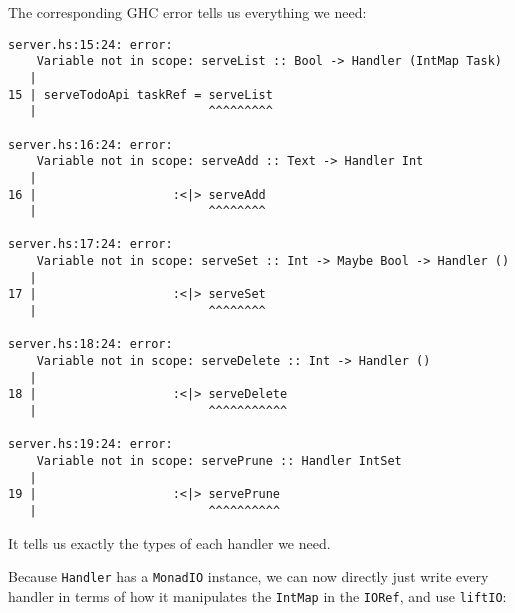 \documentclass[]{article}
\begin{document}
The corresponding GHC error tells us everything we need:

\begin{verbatim}
server.hs:15:24: error:
    Variable not in scope: serveList :: Bool -> Handler (IntMap Task)
   |
15 | serveTodoApi taskRef = serveList
   |                        ^^^^^^^^^

server.hs:16:24: error:
    Variable not in scope: serveAdd :: Text -> Handler Int
   |
16 |                   :<|> serveAdd
   |                        ^^^^^^^^

server.hs:17:24: error:
    Variable not in scope: serveSet :: Int -> Maybe Bool -> Handler ()
   |
17 |                   :<|> serveSet
   |                        ^^^^^^^^

server.hs:18:24: error:
    Variable not in scope: serveDelete :: Int -> Handler ()
   |
18 |                   :<|> serveDelete
   |                        ^^^^^^^^^^^

server.hs:19:24: error:
    Variable not in scope: servePrune :: Handler IntSet
   |
19 |                   :<|> servePrune
   |                        ^^^^^^^^^^
\end{verbatim}

It tells us exactly the types of each handler we need.

Because \texttt{Handler} has a \texttt{MonadIO} instance, we can now directly
just write every handler in terms of how it manipulates the \texttt{IntMap} in
the \texttt{IORef}, and use \texttt{liftIO}:
\end{document}
